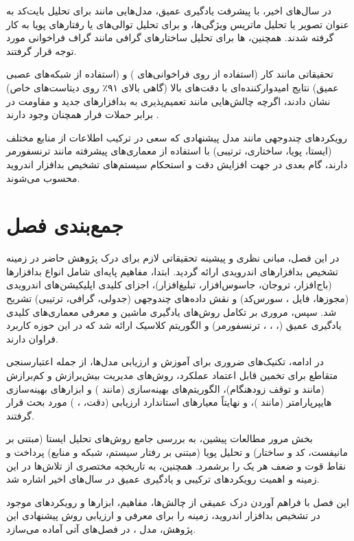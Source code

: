 در سال‌های اخیر، با پیشرفت یادگیری عمیق، مدل‌هایی مانند  برای تحلیل بایت‌کد به عنوان تصویر یا تحلیل ماتریس ویژگی‌ها، و  برای تحلیل توالی‌های  یا رفتارهای پویا به کار گرفته شدند. همچنین، ها برای تحلیل ساختارهای گرافی مانند گراف فراخوانی مورد توجه قرار گرفتند.

تحقیقاتی مانند کار \textcite{ZhangNix2017} (استفاده از  روی فراخوانی‌های ) و \textcite{Vinayakumar2019} (استفاده از شبکه‌های عصبی عمیق) نتایج امیدوارکننده‌ای با دقت‌های بالا (گاهی بالای ۹۱٪ روی دیتاست‌های خاص) نشان دادند، اگرچه چالش‌هایی مانند تعمیم‌پذیری به بدافزارهای جدید و مقاومت در برابر حملات فرار همچنان وجود دارند \cite{Demontis2017}.

رویکردهای چندوجهی مانند مدل پیشنهادی  که سعی در ترکیب اطلاعات از منابع مختلف (ایستا، پویا، ساختاری، ترتیبی) با استفاده از معماری‌های پیشرفته مانند ترنسفورمر دارند، گام بعدی در جهت افزایش دقت و استحکام سیستم‌های تشخیص بدافزار اندروید محسوب می‌شوند.

\section{جمع‌بندی فصل}
در این فصل، مبانی نظری و پیشینه تحقیقاتی لازم برای درک پژوهش حاضر در زمینه تشخیص بدافزارهای اندرویدی ارائه گردید. ابتدا، مفاهیم پایه‌ای شامل انواع بدافزارها (باج‌افزار، تروجان، جاسوس‌افزار، تبلیغ‌افزار)، اجزای کلیدی اپلیکیشن‌های اندرویدی (مجوزها، فایل ، سورس‌کد) و نقش داده‌های چندوجهی (جدولی، گرافی، ترتیبی) تشریح شد. سپس، مروری بر تکامل روش‌های یادگیری ماشین و معرفی معماری‌های کلیدی یادگیری عمیق (، ، ، ترنسفورمر) و الگوریتم کلاسیک  ارائه شد که در این حوزه کاربرد فراوان دارند.

در ادامه، تکنیک‌های ضروری برای آموزش و ارزیابی مدل‌ها، از جمله اعتبارسنجی متقاطع برای تخمین قابل اعتماد عملکرد، روش‌های مدیریت بیش‌برازش و کم‌برازش (مانند  و توقف زودهنگام)، الگوریتم‌های بهینه‌سازی (مانند ) و ابزارهای بهینه‌سازی هایپرپارامتر (مانند )، و نهایتاً معیارهای استاندارد ارزیابی (دقت، ، ) مورد بحث قرار گرفتند.

بخش مرور مطالعات پیشین، به بررسی جامع روش‌های تحلیل ایستا (مبتنی بر مانیفست، کد و ساختار) و تحلیل پویا (مبتنی بر رفتار سیستم، شبکه و منابع) پرداخت و نقاط قوت و ضعف هر یک را برشمرد. همچنین، به تاریخچه مختصری از تلاش‌ها در این زمینه و اهمیت رویکردهای ترکیبی و یادگیری عمیق در سال‌های اخیر اشاره شد.

این فصل با فراهم آوردن درک عمیقی از چالش‌ها، مفاهیم، ابزارها و رویکردهای موجود در تشخیص بدافزار اندروید، زمینه را برای معرفی و ارزیابی روش پیشنهادی این پژوهش، مدل ، در فصل‌های آتی آماده می‌سازد.


